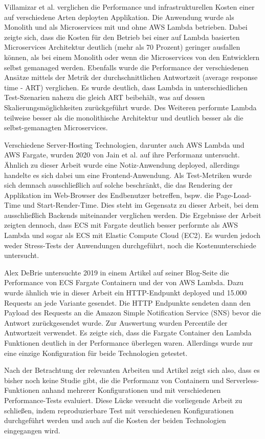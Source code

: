 Villamizar et al. verglichen die Performance und infrastrukturellen Kosten einer auf verschiedene Arten deployten Applikation\cite{villamizar_infrastructure_2016}. Die Anwendung wurde als Monolith und als Microservices mit und ohne AWS Lambda betrieben. Dabei zeigte sich,  dass die Kosten für den Betrieb bei einer auf Lambda basierten Microservices Architektur deutlich (mehr als 70 Prozent) geringer ausfallen können, als bei einem Monolith oder wenn die Microservices von den Entwicklern selbst gemanaged werden. Ebenfalls wurde die Performance der verschiedenen Ansätze mittels der Metrik der durchschnittlichen Antwortzeit (average response time - ART) verglichen. Es wurde deutlich, dass Lambda in unterschiedlichen Test-Szenarien nahezu die gleich ART beibehält, was auf dessen Skalierungsmöglichkeiten zurückgeführt wurde. Des Weiteren performte Lambda teilweise besser als die monolithische Architektur und deutlich besser als die selbst-gemanagten Microservices.

Verschiedene Server-Hosting Technologien, darunter auch AWS Lambda und AWS Fargate, wurden 2020 von Jain et al. auf ihre Performanz untersucht. Ähnlich zu dieser Arbeit wurde eine Notiz-Anwendung deployed, allerdings handelte es sich dabei um eine Frontend-Anwendung. Als Test-Metriken wurde sich demnach ausschließlich auf solche beschränkt, die das Rendering der Applikation im Web-Browser des Endbenutzer betreffen, bspw. die Page-Load-Time und Start-Render-Time. Dies steht im Gegensatz zu dieser Arbeit, bei dem ausschließlich Backends miteinander verglichen werden. Die Ergebnisse der Arbeit zeigten dennoch, dass ECS mit Fargate deutlich besser performte als AWS Lambda und sogar als ECS mit Elastic Compute Cloud (EC2). Es wurden jedoch weder Stress-Tests der Anwendungen durchgeführt, noch die Kostenunterschiede untersucht.

Alex DeBrie untersuchte 2019 in einem Artikel auf seiner Blog-Seite die Performance von ECS Fargate Containern und der von AWS Lambda\cite{debrie_aws_2019}. Dazu wurde ähnlich wie in dieser Arbeit ein HTTP-Endpunkt deployed und 15.000 Requests an jede Variante gesendet. Die HTTP Endpunkte sendeten dann den Payload des Requests an die Amazon Simple Notification Service (SNS) bevor die Antwort zurückgesendet wurde. Zur Auswertung wurden Percentile der Antwortzeit verwendet. Es zeigte sich, dass die Fargate Container den Lambda Funktionen deutlich in der Performance überlegen waren. Allerdings wurde nur eine einzige Konfiguration für beide Technologien getestet.

Nach der Betrachtung der relevanten Arbeiten und Artikel zeigt sich also, dass es bisher noch keine Studie gibt, die die Performanz von Containern und Serverless-Funktionen anhand mehrerer Konfigurationen und mit verschiedenen Performance-Tests evaluiert. Diese Lücke versucht die vorliegende Arbeit zu schließen, indem reproduzierbare Test mit verschiedenen Konfigurationen durchgeführt werden und auch auf die Kosten der beiden Technologien eingegangen wird.